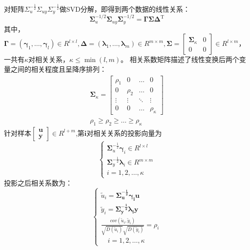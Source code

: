 \documentclass[lang=cn,11pt,a4paper]{elegantpaper}
\begin{document}
对矩阵$\Sigma_u^{-\frac{1}{2}}\Sigma_{u y}\Sigma_{y}^{-\frac{1}{2}}$做SVD分解，即得到两个数据的线性关系：
\begin{equation}
	\boldsymbol{\Sigma}_{u}^{-1/2} \boldsymbol{\Sigma}_{u y} \boldsymbol{\Sigma}_{y}^{-1 / 2}=\boldsymbol{\Gamma} \boldsymbol{\Sigma} \boldsymbol{\Delta}^{\mathrm{T}}
\end{equation}
其中，$\boldsymbol{\Gamma}=\left(\boldsymbol{\gamma}_{1}, \ldots, \boldsymbol{\gamma}_{l}\right)\in R^{l\times l}, \boldsymbol{\Delta}=\left(\boldsymbol{\lambda}_{1}, \ldots, \boldsymbol{\lambda}_{m}\right)\in R^{m\times m}, \boldsymbol{\Sigma}=\left[\begin{array}{cc}\boldsymbol{\Sigma}_{\kappa} & 0 \\ 0 & 0\end{array}\right]\in R^{l\times m}$，一共有$\kappa$对相关关系，$\kappa \leq \min (l, m)$。
相关系数矩阵描述了线性变换后两个变量之间的相关程度且呈降序排列：
\begin{equation}
	\begin{aligned}
		\boldsymbol{\Sigma}_{\kappa}=
		\left[\begin{array}{cccc}
			\rho_1&  0& \ldots & 0 \\
			0&  \rho_2& \ldots & 0 \\
			\vdots&\vdots  &\ddots  & \vdots \\
			0&0  &\ldots  &\rho_{\kappa} 
		\end{array}\right]\\
		\rho_1\geq \rho_2 \geq \ldots \geq \rho_{\kappa}
	\end{aligned}
\end{equation}
针对样本$\left[\begin{array}{c}
	\boldsymbol{u}	\\
	\boldsymbol{y}
\end{array}\right]\in R^{l+m}$,第$\boldsymbol{i}$对相关关系的投影向量为
\begin{equation}
	\begin{cases}
		\boldsymbol{\Sigma}_{u}^{-\frac{1}{2}}\boldsymbol{\gamma}_{i}\in R^{l\times l}\\
		\boldsymbol{\Sigma}_{y}^{-\frac{1}{2}}\boldsymbol{\lambda}_{i}\in R^{m\times m}\\
		i = 1,2,\ldots,\kappa
	\end{cases}
\end{equation}
投影之后相关系数为：
\begin{equation}
	\begin{cases}
		\tilde{u}_i =\boldsymbol{\Sigma_u^{-\frac{1}{2}}}\boldsymbol{\gamma_i}\boldsymbol{u}\\
		\tilde{y}_i =\boldsymbol{\Sigma_y^{-\frac{1}{2}}}\boldsymbol{\lambda_i}\boldsymbol{y}\\
		\frac{cov(\tilde{u}_i,\tilde{y}_i)}{\sqrt{D(\tilde{u}_i)}\sqrt{D(\tilde{y}_i)}}=\rho_i\\ \quad i=1,2,\ldots,\kappa	
	\end{cases}
\end{equation}
\end{document}
